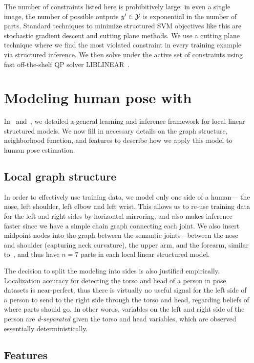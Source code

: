 The number of constraints listed here is prohibitively large: in even a single 
image, the number of possible outputs $y' \in \mathcal{Y}$ is exponential in the number 
of parts.  Standard techniques to minimize structured SVM objectives like this 
are stochastic gradient descent and cutting plane methods.  We use a cutting 
plane technique where we find the most violated constraint in every training 
example via structured inference.  We then solve  under the 
active set of constraints using fast off-the-shelf QP solver 
LIBLINEAR~\citep{liblinear}.  

\section{Modeling human pose with \LLPS}
In~ and~, we detailed a general 
learning and inference framework for local linear structured models.  We now 
fill in necessary details on the graph structure, neighborhood function, and 
features to describe how we apply this model to human pose estimation.
\subsection{Local graph structure}
In order to effectively use training data, we model only one side of a human--- 
the nose, left shoulder, left elbow and left wrist. This allows us to re-use 
training data for the left and right sides by horizontal mirroring, and also 
makes inference faster since we have a simple chain graph connecting each 
joint.  We also insert midpoint nodes into the graph between the semantic 
joints---between the nose and shoulder  (capturing neck curvature), the upper 
arm, and the forearm, similar to~\citet{deva2011}, and thus have $n=7$ parts in 
each local linear structured model.

The decision to split the modeling into sides is also justified empirically.  
Localization accuracy for detecting the torso and head of a person in pose
datasets is near-perfect, thus there is virtually no useful signal for the left 
side of a person to send to the right side through the torso and head, 
regarding beliefs of where parts should go.  In other words, variables on the 
left and right side of the person are {\em d-separated} \citep{koller-book} 
given the torso and head variables, which are observed essentially 
deterministically.

\subsection{Features}

